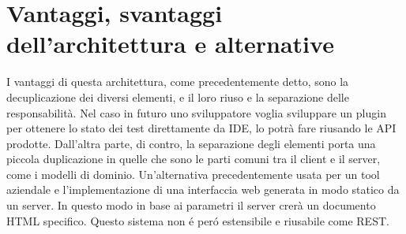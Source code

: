 \section{Vantaggi, svantaggi dell'architettura e alternative}
    I vantaggi di questa architettura, come precedentemente detto, sono la decuplicazione dei diversi elementi, e il loro riuso e la separazione delle responsabilità.
    Nel caso in futuro uno sviluppatore voglia sviluppare un plugin per ottenere lo stato dei test direttamente da IDE, lo potrà fare riusando le API prodotte.
    Dall'altra parte, di contro, la separazione degli elementi porta una piccola duplicazione in quelle che sono le parti comuni tra il client e il server, come i modelli di dominio.
    Un'alternativa precedentemente usata per un tool aziendale e l'implementazione di una interfaccia web generata in modo statico da un server.
    In questo modo in base ai parametri il server crerà un documento HTML specifico.
    Questo sistema non \'e per\'o estensibile e riusabile come REST.
